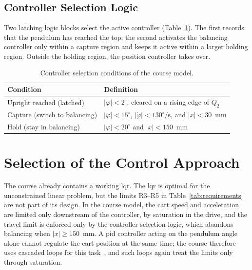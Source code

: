 \subsection{Controller Selection Logic}
\label{subsec:modelogic}

Two latching logic blocks select the active controller
(Table~\ref{tab:modelogic}). The first records that the pendulum has reached
the top; the second activates the balancing controller only within a capture
region and keeps it active within a larger holding region. Outside the holding
region, the position controller takes over.

\begin{table}[ht]
\centering
\caption{Controller selection conditions of the course model.}
\label{tab:modelogic}
\begin{tabular}{p{}p{}}
\toprule
Condition & Definition \\
\midrule
Upright reached (latched) & $|\varphi| < 2^\circ$; cleared on a rising edge of $Q_2$ \\
Capture (switch to balancing) & $|\varphi| < 15^\circ$, $|\dot{\varphi}| < 130^\circ/\mathrm{s}$, and $|x| < 30$~mm \\
Hold (stay in balancing) & $|\varphi| < 20^\circ$ and $|x| < 150$~mm \\
\bottomrule
\end{tabular}
\end{table}

\section{Selection of the Control Approach}
\label{sec:selection}

The course already contains a working \ac{lqr}. The \ac{lqr} is optimal for
the unconstrained linear problem, but the limits R3--R5 in
Table~\ref{tab:requirements} are not part of its design. In the course model,
the cart speed and acceleration are limited only downstream of the controller,
by saturation in the drive, and the travel limit is enforced only by the
controller selection logic, which abandons balancing when $|x| \ge 150$~mm.
A \ac{pid} controller acting on the pendulum angle alone cannot regulate the
cart position at the same time; the course therefore uses cascaded loops for
this task~\cite{ln_manual}, and such loops again treat the limits only through
saturation.

